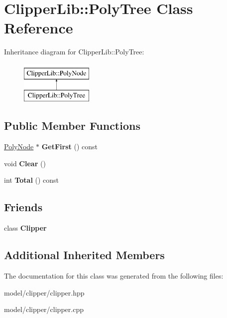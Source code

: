 \hypertarget{classClipperLib_1_1PolyTree}{\section{Clipper\-Lib\-:\-:Poly\-Tree Class Reference}
\label{classClipperLib_1_1PolyTree}
}
Inheritance diagram for Clipper\-Lib\-:\-:Poly\-Tree\-:\begin{figure}[H]
\begin{center}
\leavevmode
\includegraphics[height=2.000000cm]{classClipperLib_1_1PolyTree}
\end{center}
\end{figure}
\subsection*{Public Member Functions}
\begin{DoxyCompactItemize}
\item 
\hypertarget{classClipperLib_1_1PolyTree_ab678adb646c636e1f7a13e56cdc5bb93}{\hyperlink{classClipperLib_1_1PolyNode}{Poly\-Node} $\ast$ {\bfseries Get\-First} () const }\label{classClipperLib_1_1PolyTree_ab678adb646c636e1f7a13e56cdc5bb93}

\item 
\hypertarget{classClipperLib_1_1PolyTree_a8620ea631d478b3c43274ac084902ec4}{void {\bfseries Clear} ()}\label{classClipperLib_1_1PolyTree_a8620ea631d478b3c43274ac084902ec4}

\item 
\hypertarget{classClipperLib_1_1PolyTree_a28951d9ee7046c57388c7ddcbb3dcb6d}{int {\bfseries Total} () const }\label{classClipperLib_1_1PolyTree_a28951d9ee7046c57388c7ddcbb3dcb6d}

\end{DoxyCompactItemize}
\subsection*{Friends}
\begin{DoxyCompactItemize}
\item 
\hypertarget{classClipperLib_1_1PolyTree_a4d39a09ecdddeeb85930dd4554a54b3c}{class {\bfseries Clipper}}\label{classClipperLib_1_1PolyTree_a4d39a09ecdddeeb85930dd4554a54b3c}

\end{DoxyCompactItemize}
\subsection*{Additional Inherited Members}


The documentation for this class was generated from the following files\-:\begin{DoxyCompactItemize}
\item 
model/clipper/clipper.\-hpp\item 
model/clipper/clipper.\-cpp\end{DoxyCompactItemize}
